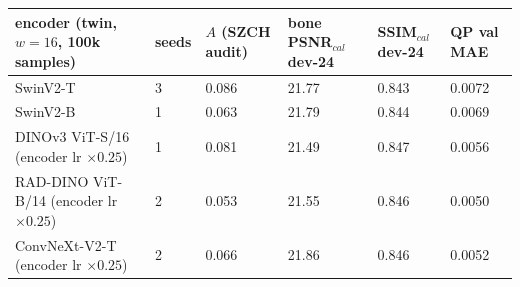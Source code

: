 \begin{tabular}{llllll}
\toprule
encoder (twin, $w=16$, 100k samples) & seeds & $A$ (SZCH audit) & bone PSNR$_{cal}$ dev-24 & SSIM$_{cal}$ dev-24 & QP val MAE \\
\midrule
SwinV2-T & 3 & 0.086 & 21.77 & 0.843 & 0.0072 \\
SwinV2-B & 1 & 0.063 & 21.79 & 0.844 & 0.0069 \\
DINOv3 ViT-S/16 (encoder lr $\times0.25$) & 1 & 0.081 & 21.49 & 0.847 & 0.0056 \\
RAD-DINO ViT-B/14 (encoder lr $\times0.25$) & 2 & 0.053 & 21.55 & 0.846 & 0.0050 \\
ConvNeXt-V2-T (encoder lr $\times0.25$) & 2 & 0.066 & 21.86 & 0.846 & 0.0052 \\
\bottomrule
\end{tabular}

